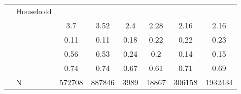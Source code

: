 \documentclass[
]{article}
\begin{document}
\begin{landscape}
\begin{table}[ht]
\begin{tabular}{l>{\raggedright\arraybackslash}p{3.2cm}|cccccc}
   & Household &  &  &  &  &  &  \\ 
   & \multicolumn{1}{>{\raggedleft\arraybackslash}p{2.7cm}|}{\makebox[2.7cm][r]{Household Size }} & 3.7 & 3.52 & 2.4 & 2.28 & 2.16 & 2.16 \\ 
   & \multicolumn{1}{>{\raggedleft\arraybackslash}p{2.2cm}|}{\makebox[2.2cm][r]{Lives Alone }} & 0.11 & 0.11 & 0.18 & 0.22 & 0.22 & 0.23 \\ 
   & \multicolumn{1}{>{\raggedleft\arraybackslash}p{2.9cm}|}{\makebox[2.9cm][r]{Lives with Child }} & 0.56 & 0.53 & 0.24 & 0.2 & 0.14 & 0.15 \\ 
   & \multicolumn{1}{>{\raggedleft\arraybackslash}p{3.4cm}|}{\makebox[3.4cm][r]{Married/Cohabiting }} & 0.74 & 0.74 & 0.67 & 0.61 & 0.71 & 0.69 \\ 
   & N & 572708 & 887846 & 3989 & 18867 & 306158 & 1932434 \\ 
   \hline
\end{tabular}
\endgroup
\end{table}



\end{landscape}
\end{document}
